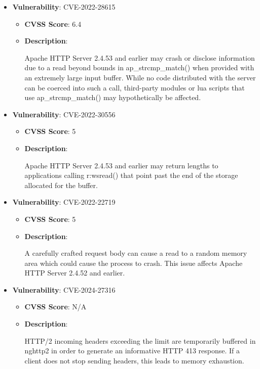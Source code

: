 \documentclass{article}
\begin{document}
\begin{itemize}
        \item \textbf{Vulnerability}: CVE-2022-28615
        \begin{itemize}
            \item \textbf{CVSS Score}:  6.4 
            \item \textbf{Description}:
            \parbox[t]{0.9\linewidth}{
                \ttfamily Apache HTTP Server 2.4.53 and earlier may crash or disclose information due to a read beyond bounds in ap\_strcmp\_match() when provided with an extremely large input buffer. While no code distributed with the server can be coerced into such a call, third-party modules or lua scripts that use ap\_strcmp\_match() may hypothetically be affected.
            }
        \end{itemize}
    
        \item \textbf{Vulnerability}: CVE-2022-30556
        \begin{itemize}
            \item \textbf{CVSS Score}:  5 
            \item \textbf{Description}:
            \parbox[t]{0.9\linewidth}{
                \ttfamily Apache HTTP Server 2.4.53 and earlier may return lengths to applications calling r:wsread() that point past the end of the storage allocated for the buffer.
            }
        \end{itemize}
    
        \item \textbf{Vulnerability}: CVE-2022-22719
        \begin{itemize}
            \item \textbf{CVSS Score}:  5 
            \item \textbf{Description}:
            \parbox[t]{0.9\linewidth}{
                \ttfamily A carefully crafted request body can cause a read to a random memory area which could cause the process to crash. This issue affects Apache HTTP Server 2.4.52 and earlier.
            }
        \end{itemize}
    
        \item \textbf{Vulnerability}: CVE-2024-27316
        \begin{itemize}
            \item \textbf{CVSS Score}:  N/A 
            \item \textbf{Description}:
            \parbox[t]{0.9\linewidth}{
                \ttfamily HTTP/2 incoming headers exceeding the limit are temporarily buffered in nghttp2 in order to generate an informative HTTP 413 response. If a client does not stop sending headers, this leads to memory exhaustion.
            }
        \end{itemize}
    

\end{itemize}
\end{document}
